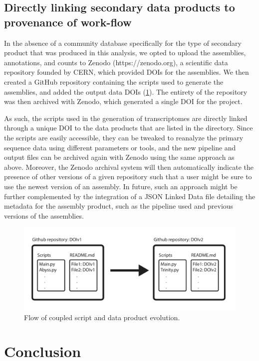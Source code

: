 \documentclass[a4paper,num-refs]{oup-contemporary}
\begin{document}
\subsection{Directly linking secondary data products to provenance of work-flow}


In the absence of a community database specifically for the type of
secondary product that was produced in this analysis, we opted to
upload the assemblies, annotations, and counts to Zenodo
(https://zenodo.org), a scientific data repository founded by CERN,
which provided DOIs for the assemblies.  We then created a GitHub
repository containing the scripts used to generate the assemblies, and
added the output data DOIs (\ref{fig:FlowDiagram}).  The entirety of the
repository was then archived with Zenodo, which generated a single DOI
for the project.

As such, the scripts used in the generation of transcriptomes are
directly linked through a unique DOI to the data products that are
listed in the directory. Since the scripts are easily accessible, they
can be tweaked to reanalyze the primary sequence data using different
parameters or tools, and the new pipeline and output files can be
archived again with Zenodo using the same approach as above.
Moreover, the Zenodo archival system will then automatically indicate
the presence of other versions of a given repository such that a user
might be sure to use the newest version of an assembly. In future,
such an approach might be further complemented by the integration of a
JSON Linked Data file detailing the metadata for the assembly product,
such as the pipeline used and previous versions of the assemblies.

\begin{figure}
  \centering
  \includegraphics[width=\linewidth]{Diagram.pdf}
  \caption{Flow of coupled script and data product evolution.}
  \label{fig:FlowDiagram}
\end{figure}
\section{Conclusion}
\end{document}
